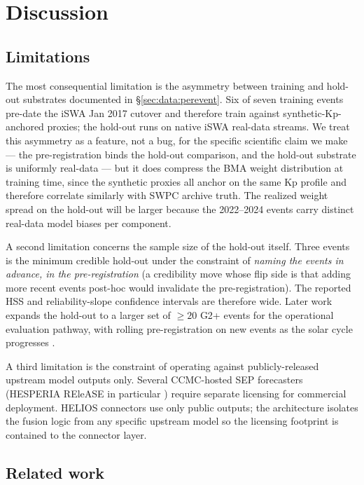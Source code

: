 \documentclass[11pt,letterpaper]{article}
\begin{document}
\section{Discussion}
\label{sec:discussion}

\subsection{Limitations}

The most consequential limitation is the asymmetry between training and
hold-out substrates documented in §\ref{sec:data:perevent}.  Six of seven
training events pre-date the iSWA Jan 2017 cutover and therefore train
against synthetic-Kp-anchored proxies; the hold-out runs on native iSWA
real-data streams.  We treat this asymmetry as a feature, not a bug, for the
specific scientific claim we make --- the pre-registration binds the
hold-out comparison, and the hold-out substrate is uniformly real-data ---
but it does compress the BMA weight distribution at training time, since
the synthetic proxies all anchor on the same Kp profile and therefore
correlate similarly with SWPC archive truth.  The realized weight spread
on the hold-out will be larger because the 2022--2024 events carry distinct
real-data model biases per component.

A second limitation concerns the sample size of the hold-out itself.
Three events is the minimum credible hold-out under the constraint of
\emph{naming the events in advance, in the pre-registration} (a credibility
move whose flip side is that adding more recent events post-hoc would
invalidate the pre-registration).  The reported HSS and reliability-slope
confidence intervals are therefore wide.  Later work expands the hold-out
to a larger set of $\ge 20$ G2+ events for the operational evaluation
pathway, with rolling pre-registration on new events as the solar cycle
progresses \cite{helios_internal}.

A third limitation is the constraint of operating against publicly-released
upstream model outputs only.  Several CCMC-hosted SEP forecasters
(HESPERIA REleASE in particular \cite{hesperia}) require separate
licensing for commercial deployment.  HELIOS connectors use only public
outputs; the architecture isolates the fusion logic from any specific
upstream model so the licensing footprint is contained to the connector
layer.

\subsection{Related work}
\label{sec:discussion:related}
\end{document}

